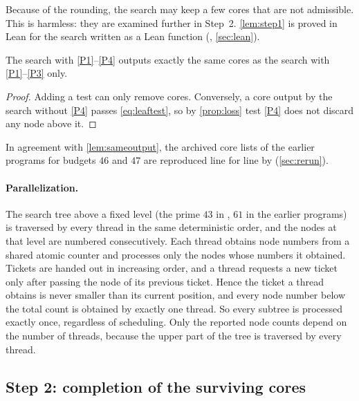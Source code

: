 \documentclass[11pt]{article}
\begin{document}
Because of the rounding, the search may keep a few cores that are not admissible. This is harmless: they are examined further in Step~2.
\cref{lem:step1} is proved in Lean for the search written as a Lean function (, \cref{sec:lean}).

\begin{lemma}\label{lem:sameoutput}
The search with \ref{P1}--\ref{P4} outputs exactly the same cores as the search with \ref{P1}--\ref{P3} only.
\end{lemma}

\begin{proof}
Adding a test can only remove cores. Conversely, a core output by the search without \ref{P4} passes \eqref{eq:leaftest}, so by \cref{prop:loss} test \ref{P4} does not discard any node above it.
\end{proof}

In agreement with \cref{lem:sameoutput}, the archived core lists of the earlier programs for budgets $46$ and $47$ are reproduced line for line by  (\cref{sec:rerun}).

\paragraph{Parallelization.}
The search tree above a fixed level (the prime $43$ in , $61$ in the earlier programs) is traversed by every thread in the same deterministic order, and the nodes at that level are numbered consecutively.
Each thread obtains node numbers from a shared atomic counter and processes only the nodes whose numbers it obtained.
Tickets are handed out in increasing order, and a thread requests a new ticket only after passing the node of its previous ticket. Hence the ticket a thread obtains is never smaller than its current position, and every node number below the total count is obtained by exactly one thread.
So every subtree is processed exactly once, regardless of scheduling. Only the reported node counts depend on the number of threads, because the upper part of the tree is traversed by every thread.

\subsection{Step 2: completion of the surviving cores}\label{sec:step2}
\end{document}
